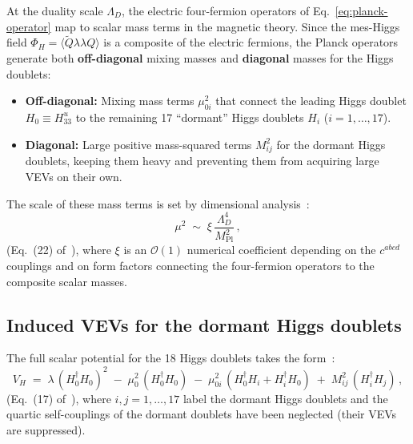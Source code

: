 \documentclass[11pt,a4paper]{article}
\begin{document}
At the duality scale $\Lambda_D$, the electric four-fermion operators
of Eq.~\eqref{eq:planck-operator} map to scalar mass terms in the
magnetic theory.  Since the mes-Higgs field
$\Phi_H = \langle \widetilde{Q}\lambda\lambda Q \rangle$ is a
composite of the electric fermions, the Planck operators generate both
\textbf{off-diagonal} mixing masses and \textbf{diagonal} masses for
the Higgs doublets:
\begin{itemize}
  \item \textbf{Off-diagonal:} Mixing mass terms $\mu_{0i}^2$ that
    connect the leading Higgs doublet $H_0 \equiv H_{33}^u$ to the
    remaining 17 ``dormant'' Higgs doublets $H_i$
    ($i = 1, \ldots, 17$).
  \item \textbf{Diagonal:} Large positive mass-squared terms $M_{ij}^2$
    for the dormant Higgs doublets, keeping them heavy and preventing
    them from acquiring large VEVs on their own.
\end{itemize}
The scale of these mass terms is set by dimensional
analysis~\cite{CacciapagliaSannino2024}:
\begin{equation}\label{eq:scalar-mass-scale}
  \mu^2 \;\sim\; \xi\, \frac{\Lambda_D^4}{M_{\text{Pl}}^2}\,,
\end{equation}
(Eq.~(22) of~\cite{CacciapagliaSannino2024}), where $\xi$ is an
$\mathcal{O}(1)$ numerical coefficient depending on the $c^{abcd}$
couplings and on form factors connecting the four-fermion operators to
the composite scalar masses.

\subsection{Induced VEVs for the dormant Higgs doublets}

The full scalar potential for the 18 Higgs doublets takes the
form~\cite{CacciapagliaSannino2024}:
\begin{equation}\label{eq:full-potential}
  V_H \;=\; \lambda\, (H_0^\dagger H_0)^2
  \;-\; \mu_0^2\, (H_0^\dagger H_0)
  \;-\; \mu_{0i}^2\, (H_0^\dagger H_i + H_i^\dagger H_0)
  \;+\; M_{ij}^2\, (H_i^\dagger H_j)\,,
\end{equation}
(Eq.~(17) of~\cite{CacciapagliaSannino2024}), where $i,j = 1,\ldots,17$
label the dormant Higgs doublets and the quartic self-couplings of the
dormant doublets have been neglected (their VEVs are suppressed).
\end{document}
